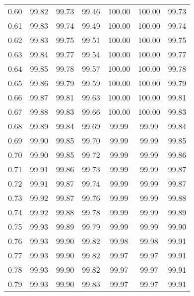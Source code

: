 \begin{tabular}{|c|c|c|c|c|c|c|}
      0.60 &     99.82 &     99.73 &      99.46 &  100.00 &     100.00 &         99.73 \\
      0.61 &     99.83 &     99.74 &      99.49 &  100.00 &     100.00 &         99.74 \\
      0.62 &     99.83 &     99.75 &      99.51 &  100.00 &     100.00 &         99.75 \\
      0.63 &     99.84 &     99.77 &      99.54 &  100.00 &     100.00 &         99.77 \\
      0.64 &     99.85 &     99.78 &      99.57 &  100.00 &     100.00 &         99.78 \\
      0.65 &     99.86 &     99.79 &      99.59 &  100.00 &     100.00 &         99.79 \\
      0.66 &     99.87 &     99.81 &      99.63 &  100.00 &     100.00 &         99.81 \\
      0.67 &     99.88 &     99.83 &      99.66 &  100.00 &     100.00 &         99.83 \\
      0.68 &     99.89 &     99.84 &      99.69 &   99.99 &      99.99 &         99.84 \\
      0.69 &     99.90 &     99.85 &      99.70 &   99.99 &      99.99 &         99.85 \\
      0.70 &     99.90 &     99.85 &      99.72 &   99.99 &      99.99 &         99.86 \\
      0.71 &     99.91 &     99.86 &      99.73 &   99.99 &      99.99 &         99.87 \\
      0.72 &     99.91 &     99.87 &      99.74 &   99.99 &      99.99 &         99.87 \\
      0.73 &     99.92 &     99.87 &      99.76 &   99.99 &      99.99 &         99.88 \\
      0.74 &     99.92 &     99.88 &      99.78 &   99.99 &      99.99 &         99.89 \\
      0.75 &     99.93 &     99.89 &      99.79 &   99.99 &      99.99 &         99.90 \\
      0.76 &     99.93 &     99.90 &      99.82 &   99.98 &      99.98 &         99.91 \\
      0.77 &     99.93 &     99.90 &      99.82 &   99.97 &      99.97 &         99.91 \\
      0.78 &     99.93 &     99.90 &      99.82 &   99.97 &      99.97 &         99.91 \\
      0.79 &     99.93 &     99.90 &      99.83 &   99.97 &      99.97 &         99.91 \\

\end{tabular}
